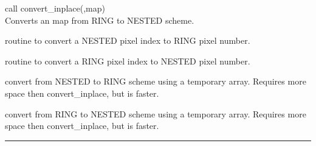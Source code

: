 \begin{example}
{
call convert\_inplace(,map)  \\
}
{
Converts an map from RING to NESTED scheme.
}
\end{example}
\begin{modules}
  \begin{sulist}{} %
 \item[\htmlref{nest2ring}{sub:pix_tools}] routine to convert a NESTED pixel index to RING pixel number.
 \item[\htmlref{ring2nest}{sub:pix_tools}] routine to convert a RING pixel index to NESTED pixel number.	
  \end{sulist}
\end{modules}

\begin{related}
  \begin{sulist}{} %
  \item[\htmlref{convert\_nest2ring}{sub:convert_nest2ring}] convert from NESTED to RING scheme using a temporary array. Requires more space then convert\_inplace, but is faster.
  \item[\htmlref{convert\_ring2nest}{sub:convert_ring2nest}]
  convert from RING to NESTED scheme using a temporary array. Requires more space then convert\_inplace, but is faster.
  \end{sulist}
\end{related}

\rule{\hsize}{2mm}

\newpage
